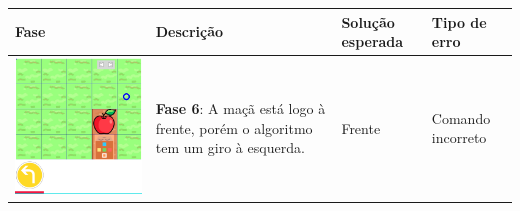 \begin{quadro}[htbp]
    \label{quadro:fases_depuracao}
    \begin{longtable}{ | m{} | m{} | m{} | m{} |}
        \hline
        \textbf{Fase}  & \textbf{Descrição} & \textbf{Solução esperada} & \textbf{Tipo de erro} \\ \hline
        \endhead
        
    
         \includegraphics[width=.9\linewidth]{figs/debug/1.png} &
    
         \textbf{Fase 6}: 
         A maçã está logo à frente, porém o algoritmo tem um giro à esquerda. & 
         
         Frente & Comando incorreto
 
         \\ \hline
     
     

\end{longtable}
\end{quadro}
